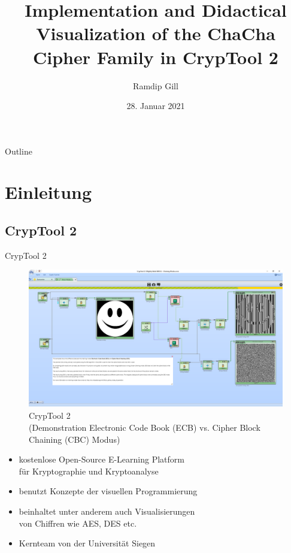 \documentclass{beamer}
\title[Impl. and Visualization of the ChaCha Cipher Family in CT2]{Implementation and Didactical Visualization of the ChaCha Cipher Family in CrypTool 2}
\author{Ramdip Gill}
\institute{Universität Heidelberg}
\date{28. Januar 2021}
\begin{document}
\begin{frame}[plain]
  \titlepage
\end{frame}

\begin{frame}[plain]{Outline}
  \tableofcontents
\end{frame}

\section{Einleitung}

\subsection{CrypTool 2}
\begin{frame}{CrypTool 2}
\begin{figure}
\center
\begin{minipage}{.6\textwidth}
\includegraphics[width=\textwidth]{figures/010_Block_Modes_Symmetric_Ciphers.png}
\end{minipage}
\caption{CrypTool 2\\(Demonstration Electronic Code Book (ECB) vs. Cipher Block Chaining (CBC) Modus)}
\end{figure}
\begin{itemize}
\item kostenlose Open-Source E-Learning Platform \\für Kryptographie und Kryptoanalyse
\item benutzt Konzepte der visuellen Programmierung
\item beinhaltet unter anderem auch Visualisierungen \\von Chiffren wie AES, DES etc.
\item Kernteam von der Universität Siegen
\end{itemize}
\end{frame}
\end{document}
